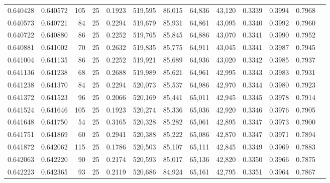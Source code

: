 \begin{tabular}{rrrrrrrrrrrrr}
0.640428 & 0.640572 &   105 &  25 &                                     0.1923 & 519,595 &  86,015 &  64,836 &  43,120 & 0.3339 & 0.3994 & 0.7968 \\
0.640573 & 0.640721 &    84 &  25 &                                     0.2294 & 519,679 &  85,931 &  64,861 &  43,095 & 0.3340 & 0.3992 & 0.7960 \\
0.640722 & 0.640880 &    86 &  25 &                                     0.2252 & 519,765 &  85,845 &  64,886 &  43,070 & 0.3341 & 0.3990 & 0.7952 \\
0.640881 & 0.641002 &    70 &  25 &                                     0.2632 & 519,835 &  85,775 &  64,911 &  43,045 & 0.3341 & 0.3987 & 0.7945 \\
0.641004 & 0.641135 &    86 &  25 &                                     0.2252 & 519,921 &  85,689 &  64,936 &  43,020 & 0.3342 & 0.3985 & 0.7937 \\
0.641136 & 0.641238 &    68 &  25 &                                     0.2688 & 519,989 &  85,621 &  64,961 &  42,995 & 0.3343 & 0.3983 & 0.7931 \\
0.641238 & 0.641370 &    84 &  25 &                                     0.2294 & 520,073 &  85,537 &  64,986 &  42,970 & 0.3344 & 0.3980 & 0.7923 \\
0.641372 & 0.641523 &    96 &  25 &                                     0.2066 & 520,169 &  85,441 &  65,011 &  42,945 & 0.3345 & 0.3978 & 0.7914 \\
0.641524 & 0.641646 &   105 &  25 &                                     0.1923 & 520,274 &  85,336 &  65,036 &  42,920 & 0.3346 & 0.3976 & 0.7905 \\
0.641648 & 0.641750 &    54 &  25 &                                     0.3165 & 520,328 &  85,282 &  65,061 &  42,895 & 0.3347 & 0.3973 & 0.7900 \\
0.641751 & 0.641869 &    60 &  25 &                                     0.2941 & 520,388 &  85,222 &  65,086 &  42,870 & 0.3347 & 0.3971 & 0.7894 \\
0.641872 & 0.642062 &   115 &  25 &                                     0.1786 & 520,503 &  85,107 &  65,111 &  42,845 & 0.3349 & 0.3969 & 0.7883 \\
0.642063 & 0.642220 &    90 &  25 &                                     0.2174 & 520,593 &  85,017 &  65,136 &  42,820 & 0.3350 & 0.3966 & 0.7875 \\
0.642223 & 0.642365 &    93 &  25 &                                     0.2119 & 520,686 &  84,924 &  65,161 &  42,795 & 0.3351 & 0.3964 & 0.7867 \\

\end{tabular}
